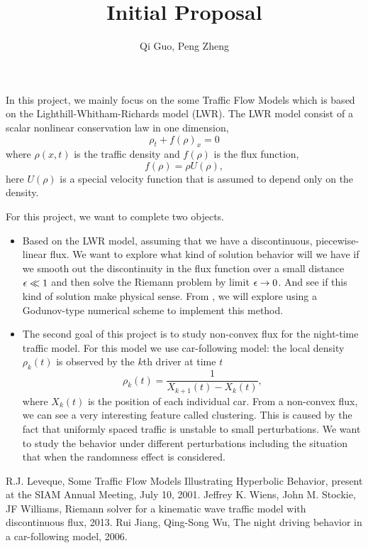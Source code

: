 \documentclass[11pt]{article}
\begin{document}
\title{\bf Initial Proposal}
\author{Qi Guo, Peng Zheng}
\date{}
\maketitle

In this project, we mainly focus on the some Traffic Flow Models which is based on the Lighthill-Whitham-Richards model (LWR). The LWR model consist of a scalar nonlinear conservation law in one dimension,
\[\rho_t+f(\rho)_x=0\]
where $\rho(x,t)$ is the traffic density and $f(\rho)$ is the flux function,
\[f(\rho)=\rho U(\rho),\]
here $U(\rho)$ is a special velocity function that is assumed to depend only on the density.

\vskip 8pt
For this project, we want to complete two objects.
\begin{itemize}
\item Based on the LWR model, assuming that we have a discontinuous, piecewise-linear flux. We want to explore what kind of solution behavior will we have if we smooth out the discontinuity in the flux function over a small distance $\epsilon\ll1$ and then solve the Riemann problem by limit $\epsilon\rightarrow0$. And see if this kind of solution make physical sense.
\vskip 8pt
From \cite{WS}, we will explore using a  Godunov-type numerical scheme to implement this method.
\item The second goal of this project is to study non-convex flux for the night-time traffic model. For this model we use car-following model: the local density $\rho_k(t)$ is observed by the $k$th driver at time $t$
\[\rho_k(t)=\frac{1}{X_{k+1}(t)-X_k(t)},\]
where $X_k(t)$ is the position of each individual car.
\vskip 8pt
From a non-convex flux, we can see a very interesting feature called clustering. This is caused by the fact that uniformly spaced traffic is unstable to small perturbations. We want to study the behavior under different perturbations including the situation that when the randomness effect is considered.

\end{itemize}
{\footnotesize
\begin{thebibliography}{100}
 R.J. Leveque, Some Traffic Flow Models Illustrating Hyperbolic Behavior, present at the SIAM Annual Meeting, July 10, 2001.
 Jeffrey K. Wiens, John M. Stockie, JF Williams, Riemann solver for a kinematic wave traffic model with discontinuous flux, 2013.
 Rui Jiang, Qing-Song Wu, The night driving behavior in a car-following model, 2006.
\end{thebibliography}
}
\end{document}

